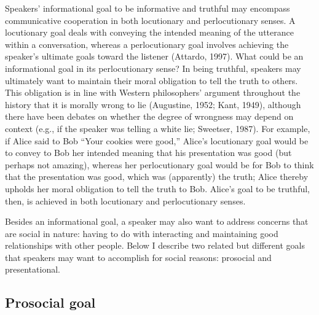 \documentclass[oneside]{report}
\begin{document}
Speakers' informational goal to be informative and truthful may
encompass communicative cooperation in both locutionary and
perlocutionary senses. A locutionary goal deals with conveying the
intended meaning of the utterance within a conversation, whereas a
perlocutionary goal involves achieving the speaker's ultimate goals
toward the listener (Attardo, 1997). What could be an informational goal
in its perlocutionary sense? In being truthful, speakers may ultimately
want to maintain their moral obligation to tell the truth to others.
This obligation is in line with Western philosophers' argument
throughout the history that it is morally wrong to lie (Augustine, 1952;
Kant, 1949), although there have been debates on whether the degree of
wrongness may depend on context (e.g., if the speaker was telling a
white lie; Sweetser, 1987). For example, if Alice said to Bob ``Your
cookies were good,'' Alice's locutionary goal would be to convey to Bob
her intended meaning that his presentation was good (but perhaps not
amazing), whereas her perlocutionary goal would be for Bob to think that
the presentation was good, which was (apparently) the truth; Alice
thereby upholds her moral obligation to tell the truth to Bob. Alice's
goal to be truthful, then, is achieved in both locutionary and
perlocutionary senses.

Besides an informational goal, a speaker may also want to address
concerns that are social in nature: having to do with interacting and
maintaining good relationships with other people. Below I describe two
related but different goals that speakers may want to accomplish for
social reasons: prosocial and presentational.

\subsection{Prosocial goal}\label{prosocial-goal}
\end{document}
